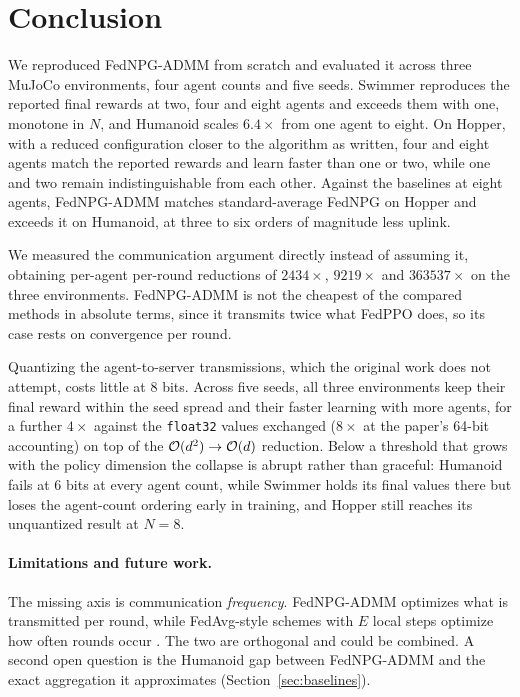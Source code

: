 \section{Conclusion}
\label{sec:conclusion}

We reproduced FedNPG-ADMM from scratch and evaluated it across three MuJoCo
environments, four agent counts and five seeds. Swimmer reproduces the
reported final rewards at two, four and eight agents and exceeds them with one,
monotone in $N$, and Humanoid scales
$6.4\times$ from one agent to eight. On Hopper, with a reduced configuration closer to the algorithm as written,
four and eight agents match the reported rewards and learn faster than one or
two, while one and two remain indistinguishable from each other. Against the baselines at eight agents,
FedNPG-ADMM matches standard-average FedNPG on Hopper and exceeds it on
Humanoid, at three to six orders of magnitude less uplink.

We measured the communication argument directly instead of assuming it,
obtaining per-agent per-round reductions of $2434\times$, $9219\times$ and
$363537\times$ on the three environments. FedNPG-ADMM is not the cheapest of
the compared methods in absolute terms, since it transmits twice what FedPPO
does, so its case rests on convergence per round.

Quantizing the agent-to-server transmissions, which the original work does not
attempt, costs little at 8 bits. Across five seeds, all three environments
keep their final reward within the seed spread and their faster learning with
more agents,
for a further $4\times$ against the \texttt{float32} values exchanged
($8\times$ at the paper's 64-bit accounting) on top of the
$\mathcal{O}(d^2) \to \mathcal{O}(d)$ reduction. Below a
threshold that grows with the policy dimension the collapse is abrupt rather
than graceful: Humanoid fails at 6 bits at every agent count, while Swimmer
holds its final values there but loses the agent-count ordering early in
training, and Hopper still reaches its unquantized result at $N=8$.

\paragraph{Limitations and future work.} The missing axis is communication
\emph{frequency}. FedNPG-ADMM optimizes what is transmitted per round, while
FedAvg-style schemes with $E$ local steps optimize how often rounds occur
\citep{jin2022fedrlheterogeneity, khodadadian2022linearspeedup}. The two are
orthogonal and could be combined. A second open question is the Humanoid gap between FedNPG-ADMM and the exact
aggregation it approximates (Section~\ref{sec:baselines}).
